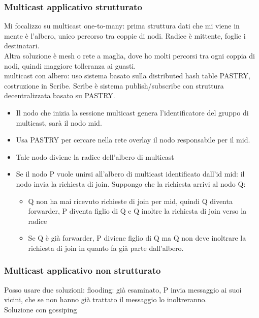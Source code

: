 \documentclass{article}
\begin{document}
\subsubsection{Multicast applicativo strutturato}
Mi focalizzo su multicast one-to-many: prima struttura dati che mi viene in mente è l'albero, unico percorso tra coppie di nodi. Radice è mittente, foglie i destinatari. \\ Altra soluzione è mesh o rete a maglia, dove ho molti percorsi tra ogni coppia di nodi, quindi maggiore tolleranza ai guasti.\\ multicast con albero: uso sistema basato sulla distributed hash table PASTRY, costruzione in Scribe. Scribe è sistema publish/subscribe con struttura decentralizzata basato su PASTRY.
\begin{itemize}
\item Il nodo che inizia la sessione multicast genera l'identificatore del gruppo di multicast, sarà il nodo mid.
\item Usa PASTRY per cercare nella rete overlay il nodo responsabile per il mid.
\item Tale nodo diviene la radice dell'albero di multicast
\item Se il nodo P vuole unirsi all'albero di multicast identificato dall'id mid: il nodo invia la richiesta di join. Suppongo che la richiesta arrivi al nodo Q:
\begin{itemize}
\item Q non ha mai ricevuto richieste di join per mid, quindi Q diventa forwarder, P diventa figlio di Q e Q inoltre la richiesta di join verso la radice
\item Se Q è già forwarder, P diviene figlio di Q ma Q non deve inoltrare la richiesta di join in quanto fa già parte dall'albero.
\end{itemize}
\end{itemize}
\subsubsection{Multicast applicativo non strutturato}
Posso usare due soluzioni:
flooding: già esaminato, P invia messaggio ai suoi vicini, che se non hanno già trattato il messaggio lo inoltreranno.\\ Soluzione con gossiping
\end{document}
